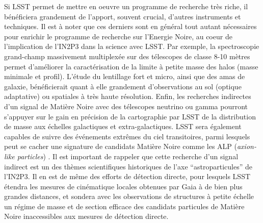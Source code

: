 \documentclass[12pt]{article}
\begin{document}
Si LSST permet de mettre en oeuvre un programme de recherche très riche, il bénéficiera grandement de l'apport, souvent crucial, d'autres instruments et techniques. Il est à noter que ces derniers sont en général tout autant nécessaires pour enrichir le programme de recherche sur l'Energie Noire, au coeur de l'implication de l'IN2P3 dans la science avec LSST.
Par exemple, la spectroscopie grand-champ massivement multiplexée sur des télescopes de classe 8-10 mètres permet d'améliorer la caractérisation de la limite à petite masse des halos (masse minimale et profil).
L'étude du lentillage fort et micro, ainsi que des amas de galaxie, bénéficierait quant à elle grandement d'observations au sol (optique adaptative) ou spatiales à très haute résolution. Enfin, les recherches indirectes d'un signal de Matière Noire avec des télescopes neutrino ou gamma \citep{Charles:2016,Albert:2017,1404.5503} pourront s'appuyer sur le gain en précision de la cartographie par LSST de la distribution de masse aux échelles galactiques et extra-galactiques. LSST sera également capables de suivre des événements extrêmes du ciel transitoires, parmi lesquels peut se cacher une signature de candidats Matière Noire comme les ALP ({\it axion-like particles}) \citep{2017PhRvL.118a1103M}.
Il est important de rappeler que cette recherche d'un signal indirect est un des thèmes scientifiques historiques de l'axe ``astroparticules'' de l'IN2P3. Il en est de même des efforts de détection directe, pour lesquels LSST étendra les mesures de cinématique locales obtenues par Gaia à de bien plus grandes distances, et sondera avec les observations de structures à petite échelle un régime de masse et de section efficace des candidats particules de Matière Noire inaccessibles aux mesures de détection directe.

\end{document}
